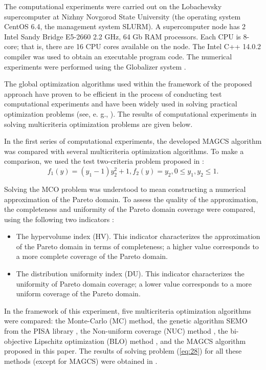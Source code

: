 \documentclass[smallextended]{svjour3}       %
\begin{document}
The computational experiments were carried out on the Lobachevsky supercomputer at Nizhny Novgorod State University (the operating system CentOS 6.4, the management system SLURM). A supercomputer node has 2 Intel Sandy Bridge E5-2660 2.2 GHz, 64 Gb RAM processors. Each CPU is 8-core; that is, there are 16 CPU cores available on the node. The Intel C++ 14.0.2 compiler was used to obtain an executable program code. The numerical experiments were performed using the Globalizer system \cite{c32}.

The global optimization algorithms used within the framework of the proposed approach have proven to be efficient in the process of conducting test computational experiments and have been widely used in solving practical optimization problems (see, e. g., \cite{c33,c34}). The results of computational experiments in solving multicriteria optimization problems are given below.

In the first series of computational experiments, the developed MAGCS algorithm was compared with several multicriteria optimization algorithms. To make a comparison, we used the test two-criteria problem proposed in \cite{c35}:
\begin{equation}\label{eq:28}
f_1 (y)=(y_1-1) y_2^2+1,f_2 (y)=y_2, 0\leq y_1,y_2 \leq 1.
\end{equation}


Solving the MCO problem was understood to mean constructing a numerical approximation of the Pareto domain. To assess the quality of the approximation, the completeness and uniformity of the Pareto domain coverage were compared, using the following two indicators \cite{c35,c36}:
\begin{itemize}
	\item 	The hypervolume index (HV). This indicator characterizes the approximation of the Pareto domain in terms of completeness; a higher value corresponds to a more complete coverage of the Pareto domain.
	\item The distribution uniformity index (DU). This indicator characterizes the uniformity of Pareto domain coverage; a lower value corresponds to a more uniform coverage of the Pareto domain.
\end{itemize}
	
In the framework of this experiment, five multicriteria optimization algorithms were compared: the Monte-Carlo (MC) method, the genetic algorithm SEMO from the PISA library \cite{c9,c36}, the Non-uniform coverage (NUC) method \cite{c35}, the bi-objective Lipschitz optimization (BLO) method \cite{c36}, and the MAGCS algorithm proposed in this paper. The results of solving problem (\ref{eq:28}) for all these methods (except for MAGCS) were obtained in \cite{c36}.
\end{document}
